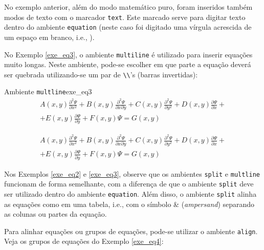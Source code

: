 No exemplo anterior, além do modo matemático puro, foram inseridos também modos de texto com o marcador {\tt text}. Este marcado serve para digitar texto dentro do ambiente {\tt equation} (neste caso foi digitado uma vírgula acrescida de um espaço em branco, i.e., \texttt{\text{, }}).

No Exemplo \ref{exe_eq3}, o ambiente {\tt multiline} é utilizado para inserir equações muito longas. Neste ambiente, pode-se escolher em que parte a equação deverá ser quebrada utilizando-se um par de \verb|\\|'s (barras invertidas):

\begin{texexptitled}[breakable,center lower,enhanced,middle=2mm]{Ambiente {\tt multline}}{exe_eq3}
\begin{multline*}
  A(x,y)\frac{\partial^2{\Psi}}{\partial{x^2}}           + 
  B(x,y)\frac{\partial^2{\Psi}}{\partial{x}\partial{y}}  +
  C(x,y)\frac{\partial^2{\Psi}}{\partial{y^2}}           +
  D(x,y)\frac{\partial{\Psi}}{\partial{x}}               + \\
+ E(x,y)\frac{\partial{\Psi}}{\partial{y}}               +
  F(x,y)\Psi = G(x,y)
\end{multline*}

\begin{multline}
  A(x,y)\frac{\partial^2{\Psi}}{\partial{x^2}}           + 
  B(x,y)\frac{\partial^2{\Psi}}{\partial{x}\partial{y}}  +
  C(x,y)\frac{\partial^2{\Psi}}{\partial{y^2}}           +
  D(x,y)\frac{\partial{\Psi}}{\partial{x}}               + \\
+ E(x,y)\frac{\partial{\Psi}}{\partial{y}}               +
  F(x,y)\Psi = G(x,y)
\end{multline}
\end{texexptitled}

Nos Exemplos \ref{exe_eq2} e \ref{exe_eq3}, observe que os ambientes {\tt split} e {\tt multline} funcionam de forma semelhante, com a diferença de que o ambiente {\tt split} deve ser utilizado dentro do ambiente {\tt equation}. Além disso, o ambiente {\tt split} alinha as equações como em uma tabela, i.e., com o símbolo \& (\textit{ampersand}) separando as colunas ou partes da equação.

Para alinhar equações ou grupos de equações, pode-se utilizar o ambiente {\tt align}. Veja os grupos de equações do Exemplo \ref{exe_eq4}:


